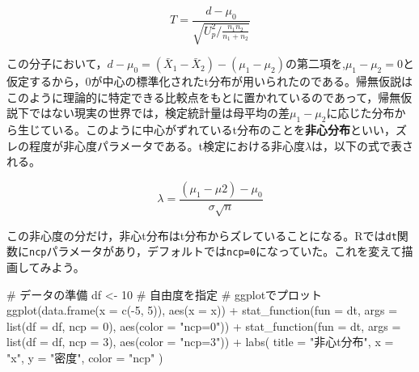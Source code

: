 \documentclass[
  a4paper,
]{ltjsbook}
\newenvironment{Shaded}{\begin{snugshade}}{\end{snugshade}}
\newcommand{\AttributeTok}[1]{\textcolor[rgb]{0.40,0.45,0.13}{#1}}
\newcommand{\CommentTok}[1]{\textcolor[rgb]{0.37,0.37,0.37}{#1}}
\newcommand{\DecValTok}[1]{\textcolor[rgb]{0.68,0.00,0.00}{#1}}
\newcommand{\FunctionTok}[1]{\textcolor[rgb]{0.28,0.35,0.67}{#1}}
\newcommand{\NormalTok}[1]{\textcolor[rgb]{0.00,0.23,0.31}{#1}}
\newcommand{\OtherTok}[1]{\textcolor[rgb]{0.00,0.23,0.31}{#1}}
\newcommand{\SpecialCharTok}[1]{\textcolor[rgb]{0.37,0.37,0.37}{#1}}
\newcommand{\StringTok}[1]{\textcolor[rgb]{0.13,0.47,0.30}{#1}}
\begin{document}
\[ T = \frac{d - \mu_0}{\sqrt{U^2_p/\frac{n_1n_2}{n_1+n_2}}}\]

この分子において，\(d - \mu_0 = (\bar{X}_1 - \bar{X}_2) - (\mu_1 - \mu_2)\)の第二項を,\(\mu_1-\mu_2 = 0\)と仮定するから，\(0\)が中心の標準化されたt分布が用いられたのである。帰無仮説はこのように理論的に特定できる比較点をもとに置かれているのであって，帰無仮説下ではない現実の世界では，検定統計量は母平均の差\(\mu_1 - \mu_2\)に応じた分布から生じている。このように中心がずれているt分布のことを\textbf{非心分布}といい，ズレの程度が非心度パラメータである。t検定における非心度\(\lambda\)は，以下の式で表される。

\[ \lambda = \frac{(\mu_1-\mu2) - \mu_0}{\sigma\sqrt{n}} \]

この非心度の分だけ，非心t分布はt分布からズレていることになる。Rでは\texttt{dt}関数に\texttt{ncp}パラメータがあり，デフォルトでは\texttt{ncp=0}になっていた。これを変えて描画してみよう。

\begin{Shaded}
\begin{Highlighting}[]
\CommentTok{\# データの準備}
\NormalTok{df }\OtherTok{\textless{}{-}} \DecValTok{10} \CommentTok{\# 自由度を指定}
\CommentTok{\# ggplotでプロット}
\FunctionTok{ggplot}\NormalTok{(}\FunctionTok{data.frame}\NormalTok{(}\AttributeTok{x =} \FunctionTok{c}\NormalTok{(}\SpecialCharTok{{-}}\DecValTok{5}\NormalTok{, }\DecValTok{5}\NormalTok{)), }\FunctionTok{aes}\NormalTok{(}\AttributeTok{x =}\NormalTok{ x)) }\SpecialCharTok{+}
  \FunctionTok{stat\_function}\NormalTok{(}\AttributeTok{fun =}\NormalTok{ dt, }\AttributeTok{args =} \FunctionTok{list}\NormalTok{(}\AttributeTok{df =}\NormalTok{ df, }\AttributeTok{ncp =} \DecValTok{0}\NormalTok{), }\FunctionTok{aes}\NormalTok{(}\AttributeTok{color =} \StringTok{"ncp=0"}\NormalTok{)) }\SpecialCharTok{+}
  \FunctionTok{stat\_function}\NormalTok{(}\AttributeTok{fun =}\NormalTok{ dt, }\AttributeTok{args =} \FunctionTok{list}\NormalTok{(}\AttributeTok{df =}\NormalTok{ df, }\AttributeTok{ncp =} \DecValTok{3}\NormalTok{), }\FunctionTok{aes}\NormalTok{(}\AttributeTok{color =} \StringTok{"ncp=3"}\NormalTok{)) }\SpecialCharTok{+}
  \FunctionTok{labs}\NormalTok{(}
    \AttributeTok{title =} \StringTok{"非心t分布"}\NormalTok{,}
    \AttributeTok{x =} \StringTok{"x"}\NormalTok{,}
    \AttributeTok{y =} \StringTok{"密度"}\NormalTok{,}
    \AttributeTok{color =} \StringTok{"ncp"}
\NormalTok{  )}
\end{Highlighting}
\end{Shaded}
\end{document}
